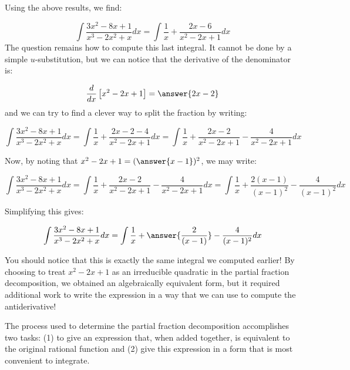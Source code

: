 \documentclass{ximera}
\begin{document}
\begin{exercise}
\begin{exercise}
\begin{exercise}
\begin{exercise}
Using the above results, we find:

 \[
 \int \frac{3x^2-8x+1}{x^3-2x^2+x} dx =\int \frac{1}{x}+\frac{2x-6}{x^2-2x+1} dx
\]
The question remains how to compute this last integral.  It cannot be done by a simple $u$-substitution, but we can notice that the derivative of the denominator is:

\[ \frac{d}{dx} \left[x^2-2x+1\right] = \answer{2x-2}
\]
and we can try to find a clever way to split the fraction by writing:

\[
 \int \frac{3x^2-8x+1}{x^3-2x^2+x} dx =\int \frac{1}{x}+\frac{2x-2-4}{x^2-2x+1} dx=\int \frac{1}{x}+\frac{2x-2}{x^2-2x+1} -\frac{4}{x^2-2x+1} dx
\]

Now, by noting that $x^2-2x+1 = (\answer{x-1})^2$, we may write:

\[
 \int \frac{3x^2-8x+1}{x^3-2x^2+x} dx =\int \frac{1}{x}+\frac{2x-2}{x^2-2x+1} -\frac{4}{x^2-2x+1} dx =\int \frac{1}{x}+\frac{2(x-1)}{(x-1)^2} -\frac{4}{(x-1)^2} dx
\]

Simplifying this gives:

\[
 \int \frac{3x^2-8x+1}{x^3-2x^2+x} dx = \int \frac{1}{x}+\answer{\frac{2}{(x-1)}} -\frac{4}{(x-1)^2} dx
\]

\begin{feedback}
You should notice that this is exactly the same integral we computed earlier!  By choosing to treat $x^2-2x+1$ as an irreducible quadratic in the partial fraction decomposition, we obtained an algebraically equivalent form, but it required additional work to write the expression in a way that we can use to compute the antiderivative!

The process used to determine the partial fraction decomposition accomplishes two tasks: (1) to give an expression that, when  added together, is equivalent to the original rational function and (2) give this expression in a form that is most convenient to integrate.
\end{feedback}

\end{exercise}
\end{exercise}
\end{exercise}
\end{exercise}
\end{document}

